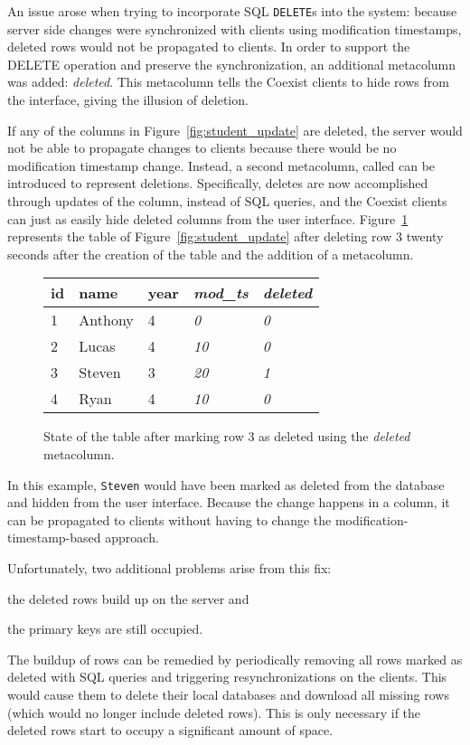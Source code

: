 An issue arose when trying to incorporate SQL \texttt{DELETE}s into the
system: because server side changes were synchronized with clients using
\mbox{modification} timestamps, deleted rows would not be propagated to clients. In
order to support the DELETE operation and preserve the synchronization, an
additional metacolumn was added: \textit{deleted}.  This metacolumn tells the
Coexist clients to hide rows from the interface, giving the illusion of
deletion. 

If any of the columns in Figure~\ref{fig:student_update} are deleted, the server
would not be able to propagate changes to clients because there would be no
modification timestamp change. Instead, a second metacolumn, called
 can be introduced to represent deletions. Specifically, deletes
are now accomplished through updates of the  column, instead of
SQL  queries, and the Coexist clients can just as easily hide deleted
columns from the user interface. Figure~\ref{fig:new_deleted} represents the
 table of Figure~\ref{fig:student_update} after deleting row 3
twenty seconds after the creation of the table and the addition of
a  metacolumn.


\begin{figure}[h!]
\center
\begin{tabular}{ l  l  l  l  l}
id  & name      & year  & \textit{mod\_ts} & \textit{deleted} \\ 
\hline
1   & Anthony   & 4     & \textit{0}   & \textit{0}     \\
2   & Lucas     & 4     & \textit{10}   & \textit{0}     \\
3   & Steven    & 3     & \textit{20}   & \textit{1}     \\
4   & Ryan      & 4     & \textit{10}   & \textit{0}     \\
\end{tabular}
\caption{State of the  table after marking row 3 as deleted using
the \textit{deleted} metacolumn.}
\label{fig:new_deleted}
\end{figure}

In this example, \texttt{Steven} would have been marked as deleted from the
database and hidden from the user interface. Because the change happens in a
column, it can be propagated to clients without having to change the
modification-timestamp-based approach.

Unfortunately, two additional problems arise from this fix: 
\begin{inparaenum}
\item the deleted rows build up on the server and
\item the primary keys are still occupied. 
\end{inparaenum}
The buildup of rows can be remedied by periodically removing all rows marked as
deleted with SQL  queries and triggering resynchronizations on the
clients. This would cause them to delete their local databases and download all
missing rows (which would no longer include deleted rows). This is only
necessary if the deleted rows start to occupy a significant amount of space.

